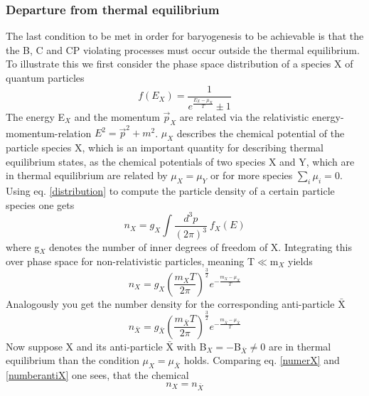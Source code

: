 \subsubsection{Departure from thermal equilibrium}
The last condition to be met in order for baryogenesis to be achievable is that the the B, C and CP violating processes must occur outside the thermal equilibrium. To illustrate this we first consider the phase space distribution of a species X of quantum particles
\begin{equation}
	f(E_X)=\frac{1}{e^{\frac{E_X-\mu_X}{T}}\pm1}
	\label{distribution}
\end{equation}
The energy E$_X$ and the momentum $\vec{p}_X$ are related via the relativistic energy-momentum-relation $E^2=\vec{p}^2+m^2$. $\mu_X$ describes the chemical potential of the particle species X, which is an important quantity for describing thermal equilibrium states, as the chemical potentials of two species X and Y, which are in thermal equilibrium are related by $\mu_X=\mu_Y$ or for more species $\sum_i\mu_i=0$.\newline
Using eq. \ref{distribution} to compute the particle density of a certain particle species one gets 
\begin{equation*}
	n_X=g_X\int\frac{d^3p}{(2\pi)^3}\:f_X(E)
\end{equation*}
where g$_X$ denotes the number of inner degrees of freedom of X. \newline
Integrating this over phase space for non-relativistic particles, meaning T$\ll$m$_X$ yields
\begin{equation}
n_X=g_X\left(\frac{m_XT}{2\pi}\right)^\frac{3}{2}e^{-\frac{m_X-\mu_X}{T}}
\label{numerX}
\end{equation}
Analogously you get the number density for the corresponding anti-particle $\bar{\text{X}}$
\begin{equation}
	n_{\bar{X}}=g_{\bar{X}}\left(\frac{m_{\bar{X}}T}{2\pi}\right)^\frac{3}{2}e^{-\frac{m_{\bar{X}}-\mu_{\bar{X}}}{T}}
\label{numberantiX}
\end{equation}
Now suppose X and its anti-particle $\bar{\text{X}}$  with B$_X=-$B$_{\bar{X}}\neq0$ are in thermal equilibrium than the condition $\mu_X=\mu_{\bar{X}}$ holds. Comparing eq. \ref{numerX} and \ref{numberantiX} one sees, that the chemical %
\begin{equation}
	n_X=n_{\bar{X}}
	\label{thermalequ}
\end{equation}
